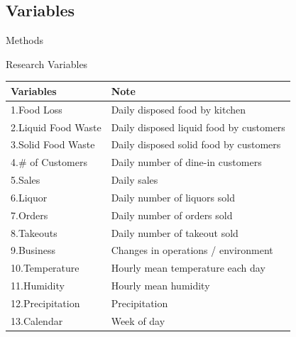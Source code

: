 \documentclass{beamer}
\begin{document}
\subsection{Variables}
\begin{frame}{Methods}
    \begin{block}{Research Variables}
    \small
        \begin{tabular}{ll}
            \hline
            Variables & Note \\ \hline
            1.Food Loss & Daily disposed food by kitchen \\
            2.Liquid Food Waste & Daily disposed liquid food by customers \\
            3.Solid Food Waste & Daily disposed solid food by customers \\ \hline
            4.\# of Customers & Daily number of dine-in customers \\
            5.Sales & Daily sales \\
            6.Liquor & Daily number of liquors sold \\
            7.Orders & Daily number of orders sold \\
            8.Takeouts & Daily number of takeout sold \\
            \vspace{0.5em}
            9.Business & Changes in operations / environment\\
            
            10.Temperature & Hourly mean temperature each day \\
            11.Humidity & Hourly mean humidity \\
            \vspace{0.5em}
            12.Precipitation & Precipitation \\ 
            13.Calendar & Week of day \\ \hline
        \end{tabular}
    \end{block}
\end{frame}

\end{document}
